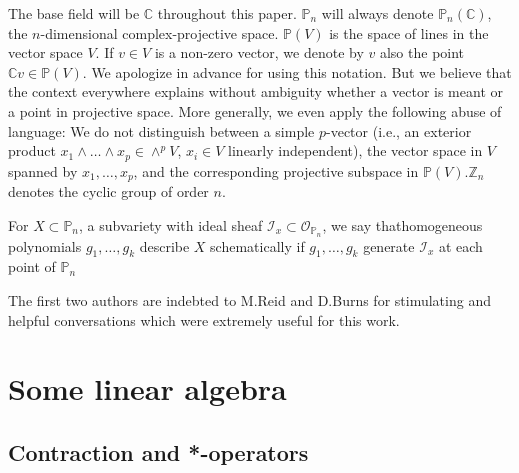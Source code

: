 The base field will be $\mathbb{C}$ throughout this
paper. $\mathbb{P}_{n}$ will always denote
$\mathbb{P}_{n}(\mathbb{C})$, the $n$-dimensional complex-projective
space. $\mathbb{P}(V)$ is the space of lines in the vector space
$V$. If $v\in V$ is a non-zero vector, we denote by $v$ also the point
$\mathbb{C}v\in \mathbb{P}(V)$. We apologize in advance for using this
notation. But we believe that the context everywhere explains without
ambiguity whether a vector is meant or a point in projective
space. More generally, we even apply the following abuse of language:
We do not distinguish between a simple $p$-vector (i.e., an exterior
product $x_{1}\wedge\ldots\wedge x_{p}\in \wedge^{p}V$, $x_{i}\in V$
linearly independent), the vector space in $V$ spanned by
$x_{1},\ldots,x_{p}$, and the corresponding projective subspace in
$\mathbb{P}(V).\mathbb{Z}_{n}$ denotes the cyclic group of order $n$.

For $X\subset \mathbb{P}_{n}$, a subvariety with ideal sheaf
$\mathscr{I}_{x}\subset \mathscr{O}_{\mathbb{P}_{n}}$, we say
that\pageoriginale homogeneous polynomials $g_{1},\ldots,g_{k}$
describe $X$ schematically if $g_{1},\ldots,g_{k}$ generate
$\mathscr{I}_{x}$ at each point of $\mathbb{P}_{n}$

The first two authors are indebted to M.\@ Reid and D.\@ Burns for
stimulating and helpful conversations which were extremely useful for
this work.

\section{Some linear algebra}\label{chap2-sec2}

\subsection{Contraction and *-operators}\label{chap2-sec2.1}

